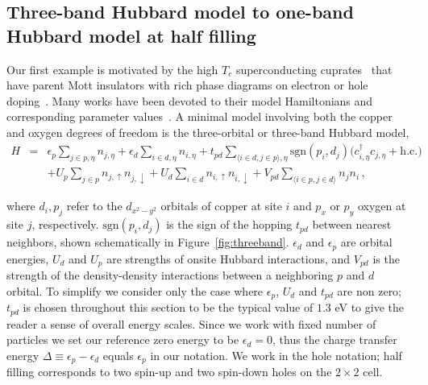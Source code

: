 \subsection{Three-band Hubbard model to one-band Hubbard model at half filling}
\label{subsection:3band} 
Our first example is motivated by the high $T_c$ superconducting cuprates~\cite{Bednorz1986} that 
have parent Mott insulators with rich phase diagrams on electron or hole doping~\cite{Dagotto_RevModPhys, LeeWen_RevModPhys}. 
Many works have been devoted to their model Hamiltonians and corresponding parameter 
values~\cite{tJSpalek, Pavirini, Emery, ZhangRice, Hybertsen_PRB1989, Hybertsen_PRB1990, Kent_Hubbard}. 
A minimal model involving both the copper and oxygen degrees of freedom 
is the three-orbital or three-band Hubbard model, 
\begin{eqnarray}
H &=&    \epsilon_p \sum_{j\in p,\eta} n_{j,\eta} + \epsilon_{d} \sum_{i \in d,\eta}  n_{i,\eta} 
        + t_{pd} \sum_{\langle i\in d ,j \in p \rangle, \eta} \text{sgn}(p_i,d_j) \Big( c_{i,\eta}^{\dagger} c_{j,\eta} + \text{h.c.} \Big) \nonumber \\
          & &   + U_p \sum_{j\in p} n_{j,\uparrow} n_{j,\downarrow} + U_d \sum_{i\in d} n_{i,\uparrow} n_{i,\downarrow} + V_{pd} \sum_{\langle i \in p ,j \in d \rangle} n_j n_i\,,
\end{eqnarray}

where $d_i,p_j$ refer to the  $d_{x^2 - y^2}$ orbitals of copper at site $i$ and $p_x$ or $p_y$ 
oxygen at site $j$, respectively. 
$\text{sgn}(p_i,d_j)$ is the sign of the hopping $t_{pd}$ 
between nearest neighbors, shown schematically in Figure~\ref{fig:threeband}. 
$\epsilon_d$ and $\epsilon_p$ are orbital energies, $U_d$ and $U_p$ are strengths of onsite Hubbard interactions,  
and $V_{pd}$ is the strength of the density-density interactions between a neighboring $p$ and $d$ orbital. 
To simplify we consider only the case where $\epsilon_p$, $U_d$ and $t_{pd}$ are non zero; $t_{pd}$ is chosen throughout this section to be the typical value of $1.3$ eV to give the reader a sense of overall energy scales. 
Since we work with fixed number of particles we set our reference zero energy to be $\epsilon_d = 0$, thus the charge transfer energy $\Delta \equiv \epsilon_p - \epsilon_d$ equals $\epsilon_p$ in our notation. 
We work in the hole notation; half filling corresponds to two spin-up and two spin-down holes on the $2\times2$ cell.

